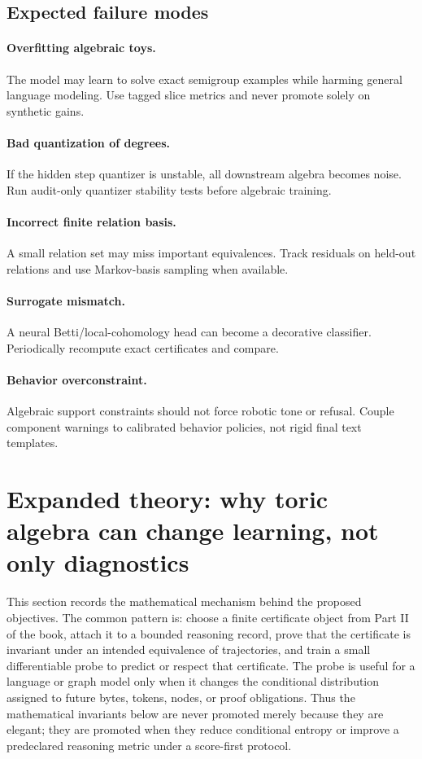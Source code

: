 \documentclass[11pt]{article}
\theoremstyle{definition}
\begin{document}
\subsection{Expected failure modes}
\paragraph{Overfitting algebraic toys.}  The model may learn to solve exact semigroup examples while harming general language modeling.  Use tagged slice metrics and never promote solely on synthetic gains.
\paragraph{Bad quantization of degrees.}  If the hidden step quantizer is unstable, all downstream algebra becomes noise.  Run audit-only quantizer stability tests before algebraic training.
\paragraph{Incorrect finite relation basis.}  A small relation set may miss important equivalences.  Track residuals on held-out relations and use Markov-basis sampling when available.
\paragraph{Surrogate mismatch.}  A neural Betti/local-cohomology head can become a decorative classifier.  Periodically recompute exact certificates and compare.
\paragraph{Behavior overconstraint.}  Algebraic support constraints should not force robotic tone or refusal.  Couple component warnings to calibrated behavior policies, not rigid final text templates.


\section{Expanded theory: why toric algebra can change learning, not only diagnostics}
This section records the mathematical mechanism behind the proposed objectives.  The common pattern is: choose a finite certificate object from Part II of the book, attach it to a bounded reasoning record, prove that the certificate is invariant under an intended equivalence of trajectories, and train a small differentiable probe to predict or respect that certificate.  The probe is useful for a language or graph model only when it changes the conditional distribution assigned to future bytes, tokens, nodes, or proof obligations.  Thus the mathematical invariants below are never promoted merely because they are elegant; they are promoted when they reduce conditional entropy or improve a predeclared reasoning metric under a score-first protocol.
\end{document}
